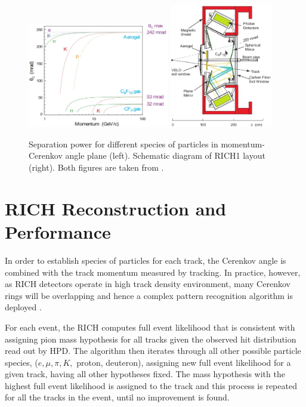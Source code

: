 \begin{figure}[!h]
	\centering
	\includegraphics[width = 0.55\textwidth]{figs/detector/richres1.eps}%
	\includegraphics[width = 0.4\textwidth]{figs/detector/mechrich.eps}%
	\caption{Separation power for different species of particles in momentum-Cerenkov angle plane (left). Schematic diagram of RICH1 layout (right). Both figures are taken from \cite{det_paper}.}
	\label{fig:richres}
\end{figure}

\section{RICH Reconstruction and Performance}
In order to establish species of particles for each track, the Cerenkov angle is combined with the track momentum measured by tracking. In practice, however, as \Gls{RICH} detectors operate in high track density environment, many Cerenkov rings will be overlapping and hence a complex pattern recognition algorithm is deployed \cite{Forty:1999sg}. 


For each event, the \Gls{RICH} computes full event likelihood that is consistent with assigning pion mass hypothesis for all tracks given the observed hit distribution read out by \Gls{HPD}. The algorithm then iterates through all other possible particle species, ($e, \mu, \pi, K,$ proton, deuteron), assigning new full event likelihood for a given track, having all other hypotheses fixed. The mass hypothesis with the highest full event likelihood is assigned to the track and this process is repeated for all the tracks in the event, until no improvement is found. 

